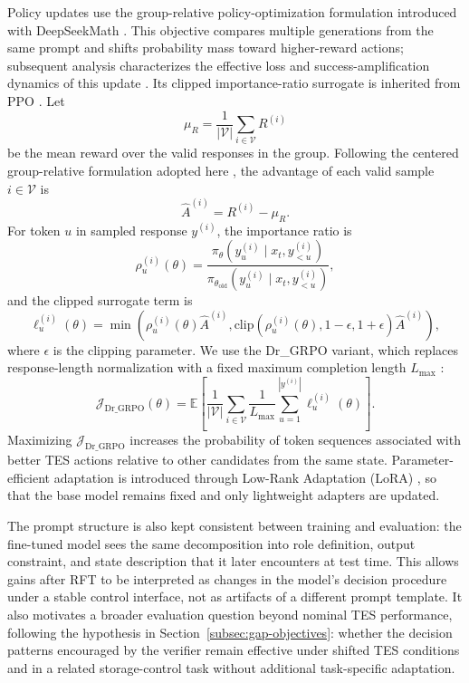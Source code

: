 \documentclass[11pt]{article}
\begin{document}
Policy updates use the group-relative policy-optimization formulation introduced with DeepSeekMath \cite{deepseekmath2024}. This objective compares multiple generations from the same prompt and shifts probability mass toward higher-reward actions; subsequent analysis characterizes the effective loss and success-amplification dynamics of this update \cite{mroueh2025rlvr}. Its clipped importance-ratio surrogate is inherited from PPO \cite{ppo2017}. Let
\begin{equation}
\mu_R=\frac{1}{|\mathcal{V}|}\sum_{i\in\mathcal{V}} R^{(i)}
\end{equation}
be the mean reward over the valid responses in the group. Following the centered group-relative formulation adopted here \cite{liu2025r1zero}, the advantage of each valid sample $i\in\mathcal{V}$ is
\begin{equation}
\hat A^{(i)}=R^{(i)}-\mu_R.
\end{equation}
For token $u$ in sampled response $y^{(i)}$, the importance ratio is
\begin{equation}
\rho^{(i)}_{u}(\theta)=
\frac{\pi_{\theta}(y^{(i)}_{u}\mid x_t,y^{(i)}_{<u})}
{\pi_{\theta_{\mathrm{old}}}(y^{(i)}_{u}\mid x_t,y^{(i)}_{<u})},
\end{equation}
and the clipped surrogate term is
\begin{equation}
\ell^{(i)}_{u}(\theta)=
\min\!\left(
\rho^{(i)}_{u}(\theta)\hat A^{(i)},
\mathrm{clip}\!\left(\rho^{(i)}_{u}(\theta),1-\epsilon,1+\epsilon\right)\hat A^{(i)}
\right),
\end{equation}
where $\epsilon$ is the clipping parameter. We use the Dr\_GRPO variant, which replaces response-length normalization with a fixed maximum completion length $L_{\max}$ \cite{liu2025r1zero}:
\begin{equation}
\mathcal{J}_{\mathrm{Dr\_GRPO}}(\theta)=
\mathbb{E}\!\left[
\frac{1}{|\mathcal{V}|}\sum_{i\in\mathcal{V}}\frac{1}{L_{\max}}\sum_{u=1}^{|y^{(i)}|}\ell^{(i)}_{u}(\theta)
\right].
\end{equation}
Maximizing $\mathcal{J}_{\mathrm{Dr\_GRPO}}$ increases the probability of token sequences associated with better TES actions relative to other candidates from the same state. Parameter-efficient adaptation is introduced through Low-Rank Adaptation (LoRA) \cite{lora2022}, so that the base model remains fixed and only lightweight adapters are updated.

The prompt structure is also kept consistent between training and evaluation: the fine-tuned model sees the same decomposition into role definition, output constraint, and state description that it later encounters at test time. This allows gains after RFT to be interpreted as changes in the model's decision procedure under a stable control interface, not as artifacts of a different prompt template. It also motivates a broader evaluation question beyond nominal TES performance, following the hypothesis in Section~\ref{subsec:gap-objectives}: whether the decision patterns encouraged by the verifier remain effective under shifted TES conditions and in a related storage-control task without additional task-specific adaptation.
\end{document}
